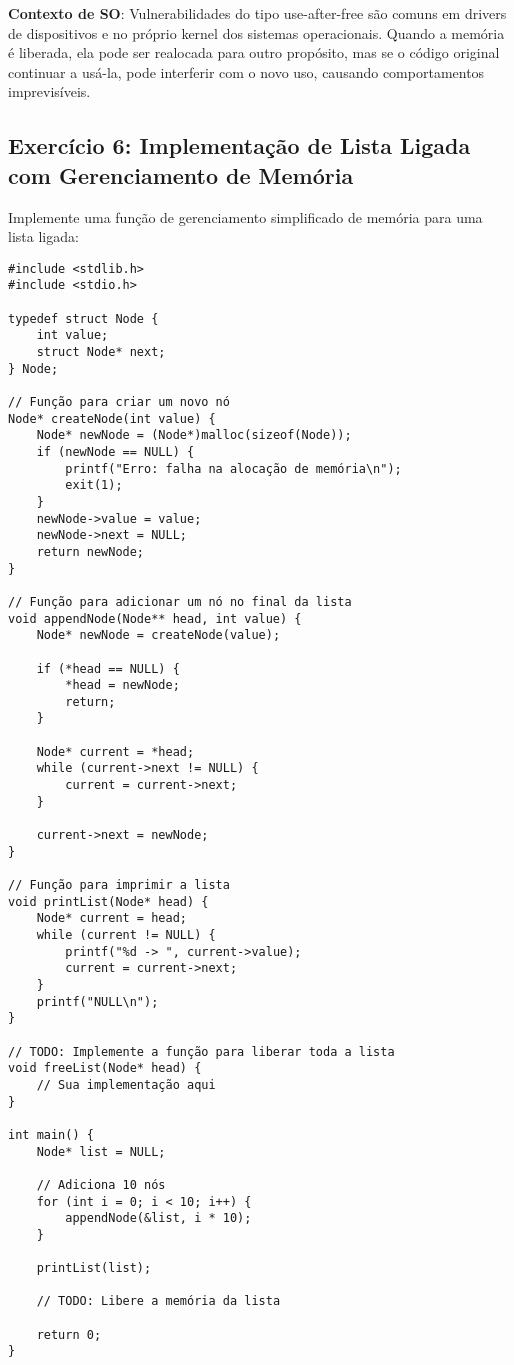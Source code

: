 \documentclass[11pt,a4paper]{article}
\begin{document}
\textbf{Contexto de SO}: Vulnerabilidades do tipo use-after-free são comuns em drivers de dispositivos e no próprio kernel dos sistemas operacionais. Quando a memória é liberada, ela pode ser realocada para outro propósito, mas se o código original continuar a usá-la, pode interferir com o novo uso, causando comportamentos imprevisíveis.

\subsection{Exercício 6: Implementação de Lista Ligada com Gerenciamento de Memória}

Implemente uma função de gerenciamento simplificado de memória para uma lista ligada:

\begin{lstlisting}
#include <stdlib.h>
#include <stdio.h>

typedef struct Node {
    int value;
    struct Node* next;
} Node;

// Função para criar um novo nó
Node* createNode(int value) {
    Node* newNode = (Node*)malloc(sizeof(Node));
    if (newNode == NULL) {
        printf("Erro: falha na alocação de memória\n");
        exit(1);
    }
    newNode->value = value;
    newNode->next = NULL;
    return newNode;
}

// Função para adicionar um nó no final da lista
void appendNode(Node** head, int value) {
    Node* newNode = createNode(value);
    
    if (*head == NULL) {
        *head = newNode;
        return;
    }
    
    Node* current = *head;
    while (current->next != NULL) {
        current = current->next;
    }
    
    current->next = newNode;
}

// Função para imprimir a lista
void printList(Node* head) {
    Node* current = head;
    while (current != NULL) {
        printf("%d -> ", current->value);
        current = current->next;
    }
    printf("NULL\n");
}

// TODO: Implemente a função para liberar toda a lista
void freeList(Node* head) {
    // Sua implementação aqui
}

int main() {
    Node* list = NULL;
    
    // Adiciona 10 nós
    for (int i = 0; i < 10; i++) {
        appendNode(&list, i * 10);
    }
    
    printList(list);
    
    // TODO: Libere a memória da lista
    
    return 0;
}
\end{lstlisting}
\end{document}
